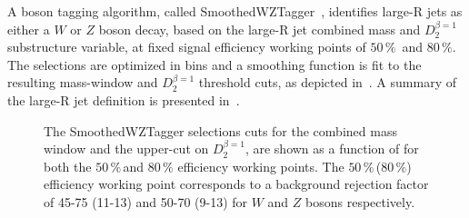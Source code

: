 A boson tagging algorithm, called SmoothedWZTagger~\cite{smoothed_wz_tagger}, identifies large-R jets as either a $W$ or $Z$ boson decay, based on the large-R jet combined mass and $D_2^{\beta=1}$ substructure variable, at fixed signal efficiency working points of $50\,\%$\, and $80\,\%$. The selections are optimized in \pT bins and a smoothing function is fit to the resulting mass-window and $D_2^{\beta=1}$ threshold cuts, as depicted in~\Fig{\ref{fig:smooth_cuts}}. A summary of the large-R jet definition is presented in~\Tab{\ref{tab:large_jet_def}}.
\begin{figure}[htbp]
\begin{center}
\caption[Boson tagger mass and substructure cuts]{The SmoothedWZTagger selections cuts for \protect{} the combined mass window and \protect{} the upper-cut on $D_2^{\beta=1}$, are shown as a function of \pT for both the $50\,\%$\,and $80\,\%$ efficiency working points. The $50\,\%$\,($80\,\%$) efficiency working point corresponds to a background rejection factor of 45-75 (11-13) and 50-70 (9-13) for $W$ and $Z$ bosons respectively.}
\label{fig:smooth_cuts}
\end{center}
\end{figure}
